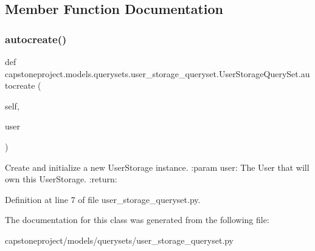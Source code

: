 \subsection{Member Function Documentation}
\mbox{\label{classcapstoneproject_1_1models_1_1querysets_1_1user__storage__queryset_1_1_user_storage_query_set_a422209e3415e6996c8ad8c628ff20b41}} 
\subsubsection{\texorpdfstring{autocreate()}{autocreate()}}
{\footnotesize\ttfamily def capstoneproject.\+models.\+querysets.\+user\+\_\+storage\+\_\+queryset.\+User\+Storage\+Query\+Set.\+autocreate (\begin{DoxyParamCaption}\item[{}]{self,  }\item[{}]{user }\end{DoxyParamCaption})}

\begin{DoxyVerb}Create and initialize a new UserStorage instance.
:param user: The User that will own this UserStorage.
:return:
\end{DoxyVerb}
 

Definition at line 7 of file user\+\_\+storage\+\_\+queryset.\+py.



The documentation for this class was generated from the following file\+:\begin{DoxyCompactItemize}
\item 
capstoneproject/models/querysets/user\+\_\+storage\+\_\+queryset.\+py\end{DoxyCompactItemize}
